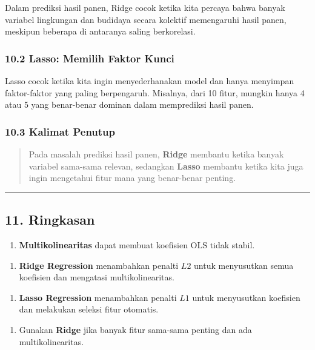 \documentclass[12pt,a4paper]{article}
\begin{document}
Dalam prediksi hasil panen, Ridge cocok ketika kita percaya bahwa banyak variabel lingkungan dan budidaya secara kolektif memengaruhi hasil panen, meskipun beberapa di antaranya saling berkorelasi.


\subsubsection{10.2 Lasso: Memilih Faktor Kunci}

Lasso cocok ketika kita ingin menyederhanakan model dan hanya menyimpan faktor-faktor yang paling berpengaruh. Misalnya, dari 10 fitur, mungkin hanya 4 atau 5 yang benar-benar dominan dalam memprediksi hasil panen.


\subsubsection{10.3 Kalimat Penutup}

\begin{quote}
Pada masalah prediksi hasil panen, \textbf{Ridge} membantu ketika banyak variabel sama-sama relevan, sedangkan \textbf{Lasso} membantu ketika kita juga ingin mengetahui fitur mana yang benar-benar penting.\end{quote}


\hrule


\subsection{11. Ringkasan}

\begin{enumerate}
\item \textbf{Multikolinearitas} dapat membuat koefisien OLS tidak stabil.
\end{enumerate}

\begin{enumerate}
\item \textbf{Ridge Regression} menambahkan penalti $L2$ untuk menyusutkan semua koefisien dan mengatasi multikolinearitas.
\end{enumerate}

\begin{enumerate}
\item \textbf{Lasso Regression} menambahkan penalti $L1$ untuk menyusutkan koefisien dan melakukan seleksi fitur otomatis.
\end{enumerate}

\begin{enumerate}
\item Gunakan \textbf{Ridge} jika banyak fitur sama-sama penting dan ada multikolinearitas.
\end{enumerate}
\end{document}
